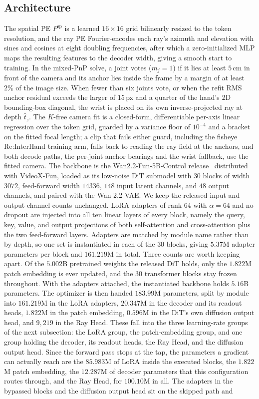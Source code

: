 \documentclass[10pt,twocolumn,letterpaper]{article}
\begin{document}
\subsection{Architecture}
The spatial PE $P^{\mathrm{sp}}$ is a learned $16\times16$ grid bilinearly resized to the token resolution, and the ray PE Fourier-encodes each ray's azimuth and elevation with sines and cosines at eight doubling frequencies, after which a zero-initialized MLP maps the resulting features to the decoder width, giving a smooth start to training. In the mixed-PnP solve, a joint votes ($m_j=1$) if it lies at least $5$\,cm in front of the camera and its anchor lies inside the frame by a margin of at least $2\%$ of the image size. When fewer than six joints vote, or when the refit RMS anchor residual exceeds the larger of $15$\,px and a quarter of the hand's 2D bounding-box diagonal, the wrist is placed on its own inverse-projected ray at depth $\hat t_z$. The $K$-free camera fit is a closed-form, differentiable per-axis linear regression over the token grid, guarded by a variance floor of $10^{-4}$ and a bracket on the fitted focal length; a clip that fails either guard, including the fisheye Re:InterHand training arm, falls back to reading the ray field at the anchors, and both decode paths, the per-joint anchor bearings and the wrist fallback, use the fitted camera. The backbone is the Wan2.2-Fun-5B-Control release~\citep{wan2025} distributed with VideoX-Fun, loaded as its low-noise DiT submodel with $30$ blocks of width $3072$, feed-forward width $14336$, $148$ input latent channels, and $48$ output channels, and paired with the Wan 2.2 VAE. We keep the released input and output channel counts unchanged. LoRA adapters of rank $64$ with $\alpha=64$ and no dropout are injected into all ten linear layers of every block, namely the query, key, value, and output projections of both self-attention and cross-attention plus the two feed-forward layers. Adapters are matched by module name rather than by depth, so one set is instantiated in each of the $30$ blocks, giving $5.37$M adapter parameters per block and $161.219$M in total. Three counts are worth keeping apart. Of the $5.002$B pretrained weights the released DiT holds, only the $1.822$M patch embedding is ever updated, and the $30$ transformer blocks stay frozen throughout. With the adapters attached, the instantiated backbone holds $5.16$B parameters. The optimizer is then handed $183.99$M parameters, split by module into $161.219$M in the LoRA adapters, $20.347$M in the decoder and its readout heads, $1.822$M in the patch embedding, $0.596$M in the DiT's own diffusion output head, and $9{,}219$ in the Ray Head. These fall into the three learning-rate groups of the next subsection: the LoRA group, the patch-embedding group, and one group holding the decoder, its readout heads, the Ray Head, and the diffusion output head. Since the forward pass stops at the tap, the parameters a gradient can actually reach are the $85.983$M of LoRA inside the executed blocks, the $1.822$M patch embedding, the $12.287$M of decoder parameters that this configuration routes through, and the Ray Head, for $100.10$M in all. The adapters in the bypassed blocks and the diffusion output head sit on the skipped path and 
\end{document}
